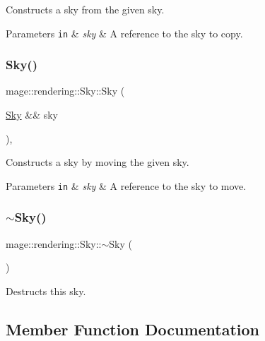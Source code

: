 Constructs a sky from the given sky.


\begin{DoxyParams}[1]{Parameters}
\mbox{\tt in}  & {\em sky} & A reference to the sky to copy. \\
\hline
\end{DoxyParams}
\hypertarget{classmage_1_1rendering_1_1_sky_aa1484300b69e97812d73e0f5281d8bbc}{}\label{classmage_1_1rendering_1_1_sky_aa1484300b69e97812d73e0f5281d8bbc} 
\subsubsection{\texorpdfstring{Sky()}{Sky()}\hspace{0.1cm}{\footnotesize\ttfamily [3/3]}}
{\footnotesize\ttfamily mage\+::rendering\+::\+Sky\+::\+Sky (\begin{DoxyParamCaption}\item[{\hyperlink{classmage_1_1rendering_1_1_sky}{Sky} \&\&}]{sky }\end{DoxyParamCaption})\hspace{0.3cm}{\ttfamily [default]}, {\ttfamily [noexcept]}}

Constructs a sky by moving the given sky.


\begin{DoxyParams}[1]{Parameters}
\mbox{\tt in}  & {\em sky} & A reference to the sky to move. \\
\hline
\end{DoxyParams}
\hypertarget{classmage_1_1rendering_1_1_sky_a948ac13394c361864f1da3dc27ab3326}{}\label{classmage_1_1rendering_1_1_sky_a948ac13394c361864f1da3dc27ab3326} 
\subsubsection{\texorpdfstring{$\sim$\+Sky()}{~Sky()}}
{\footnotesize\ttfamily mage\+::rendering\+::\+Sky\+::$\sim$\+Sky (\begin{DoxyParamCaption}{ }\end{DoxyParamCaption})\hspace{0.3cm}{\ttfamily [default]}}

Destructs this sky. 

\subsection{Member Function Documentation}
\hypertarget{classmage_1_1rendering_1_1_sky_a8ded7262b242de3e76e4bdcd5a91f4c3}{}\label{classmage_1_1rendering_1_1_sky_a8ded7262b242de3e76e4bdcd5a91f4c3} 
